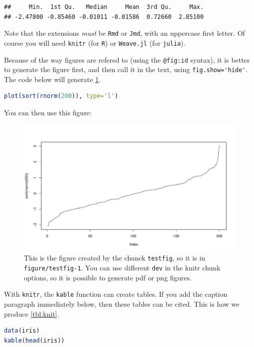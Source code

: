 \documentclass[12pt]{article}
\begin{document}
\begin{lstlisting}
##     Min.  1st Qu.   Median     Mean  3rd Qu.     Max. 
## -2.47800 -0.85460 -0.01011 -0.01586  0.72660  2.85100
\end{lstlisting}

Note that the extensions \emph{must} be \lstinline!Rmd! or
\lstinline!Jmd!, with an uppercase first letter. Of course you will need
\lstinline!knitr! (for \lstinline!R!) or \lstinline!Weave.jl! (for
\lstinline!julia!).

Because of the way figures are refered to (using the \lstinline!@fig:id!
syntax), it is better to generate the figure first, and then call it in
the text, using \lstinline!fig.show='hide'!. The code below will
generate \cref{fig:chunk}.

\begin{lstlisting}[language=R]
plot(sort(rnorm(200)), type='l')
\end{lstlisting}

You can then use this figure:

\begin{figure}[htbp]
\centering
\includegraphics[width=1.00000\textwidth]{figure/testfig-1.pdf}
\caption{This is the figure created by the chunck \lstinline!testfig!,
so it is in \lstinline!figure/testfig-1!. You can use different
\lstinline!dev! in the knitr chunk options, so it is possible to
generate pdf or png figures.\label{fig:chunk}}
\end{figure}

With \lstinline!knitr!, the \lstinline!kable! function can create
tables. If you add the caption paragraph immediately below, then these
tables can be cited. This is how we produce
\cref{tbl:knit}.

\begin{lstlisting}[language=R]
data(iris)
kable(head(iris))
\end{lstlisting}
\end{document}
